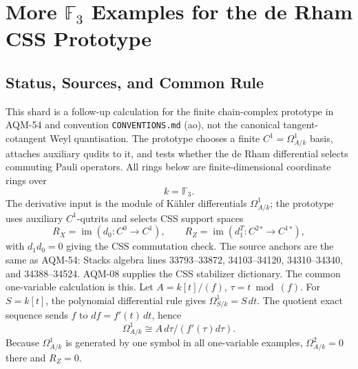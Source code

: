 \section{More \texorpdfstring{\(\mathbb F_3\)}{F3} Examples for the de Rham CSS Prototype}
\label{sec:derham-css-more-f3-examples}
\subsection{Status, Sources, and Common Rule}
This shard is a follow-up calculation for the finite chain-complex prototype in
AQM-54 and convention \texttt{CONVENTIONS.md} (ao), not the canonical
tangent-cotangent Weyl quantisation.  The prototype chooses a finite
\(C^1=\Omega^1_{A/k}\) basis, attaches auxiliary qudits to it, and tests whether
the de Rham differential selects commuting Pauli operators.  All rings below are
finite-dimensional coordinate rings over
\[
  k=\mathbb F_3.
\]
The derivative input is the module of K\"ahler differentials
\(\Omega^1_{A/k}\); the prototype uses auxiliary \(C^1\)-qutrits and selects CSS
support spaces
\[
  R_X=\operatorname{im}(d_0:C^0\to C^1),\qquad
  R_Z=\operatorname{im}(d_1^T:C^2{}^*\to C^1{}^*),
\]
with \(d_1d_0=0\) giving the CSS commutation check.  The source anchors are the
same as AQM-54: Stacks algebra lines 33793--33872, 34103--34120, 34310--34340,
and 34388--34524.  AQM-08 supplies the CSS stabilizer dictionary.
The common one-variable calculation is this.  Let
\(A=k[t]/(f)\), \(\tau=t\bmod(f)\).  For \(S=k[t]\), the polynomial
differential rule gives \(\Omega^1_{S/k}=S\,dt\).  The quotient exact
sequence sends \(f\) to \(df=f'(t)\,dt\), hence
\[
  \Omega^1_{A/k}\cong A\,d\tau/(f'(\tau)d\tau).
\]
Because \(\Omega^1_{A/k}\) is generated by one symbol in all one-variable
examples, \(\Omega^2_{A/k}=0\) there and \(R_Z=0\).
